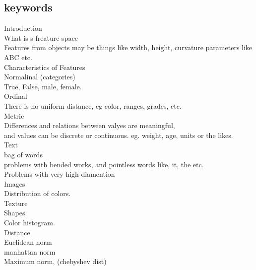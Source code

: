 \documentclass[a4paper,10pt,titlepage]{report}
\begin{document}
\subsection{keywords}
Introduction \\
What is s freature space \\
\hspace{10mm}		Features from objects may be things like width, height, curvature parameters like ABC etc.\\
Characteristics of Features	\\
\hspace{10mm}			Normalinal (categories)\\
\hspace{15mm}				True, False, male, female. \\
\hspace{10mm}			Ordinal \\
\hspace{15mm}				There is no uniform distance, eg color, ranges, grades, etc. \\
\hspace{10mm}			Metric \\
\hspace{15mm}				Differences and relations between valyes are meaningful, \\
\hspace{15mm} 				and values can be  discrete or continuous. eg. weight, age, units or the likes. \\
\hspace{5mm}		Text\\
\hspace{10mm}		bag of words \\
\hspace{15mm}		problems with bended works, and pointless words like, it, the etc. \\
\hspace{15mm}		Problems with very high diamention \\	
\hspace{5mm} Images\\
\hspace{10mm}			Distribution of colors. \\
\hspace{10mm}			Texture \\
\hspace{10mm}			Shapes \\
\hspace{10mm}		    Color histogram. \\
 Distance \\
\hspace{10mm}		Euclidean norm \\
\hspace{10mm}		manhattan norm \\
\hspace{10mm} 		Maximum norm, (chebyshev dist) \\
	
\end{document}
